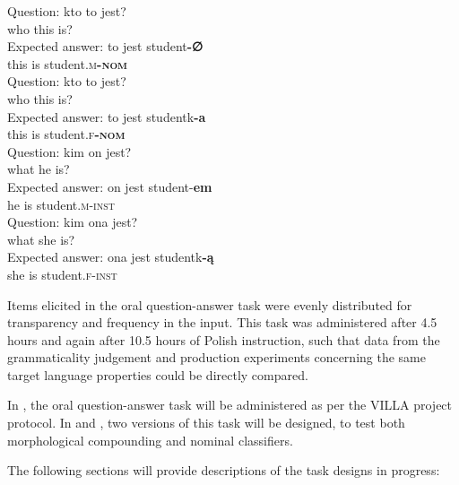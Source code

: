 \documentclass[output=paper,colorlinks,citecolor=brown,modfonts,nonflat]{../langscibook}
\begin{document}
\ea%
    \label{ex:watorek:4}
    \ea%
    \label{ex:watorek:4a}
    \gll    Question: kto to jest?\\
            {} who this is?\\
            
    \gll    Expected answer: to jest student\textbf{-∅}\\
            {} {} this is student\textsc{.m\textbf{-nom}}\\
    \ex%
    \label{ex:watorek:4b}
    \gll    Question: kto to jest?\\
            {} who this is?\\
            
    \gll    Expected answer: to jest studentk\textbf{{-a}}\\
            {} {} this is student\textsc{.f\textbf{-nom}}\\
    \ex%
    \label{ex:watorek:4c}
    \gll    Question: kim on jest?\\
            {} what he is?\\
            
    \gll    Expected answer: on jest student-\textbf{{em}}\\
            {} {} he is student\textsc{.m-inst}\\
    \ex%
    \label{ex:watorek:4d}
    \gll    Question: kim ona jest?\\
            {} what she is?\\

    \gll    Expected answer: ona jest studentk\textbf{{-ą}}\\
            {} {} she is student\textsc{.f-inst}\\
    \z
\z

Items elicited in the oral question-answer task were evenly distributed for transparency and frequency in the input. This task was administered after 4.5 hours and again after 10.5 hours of Polish instruction, such that data from the grammaticality judgement and production experiments concerning the same target language properties could be directly compared. 

In , the oral question-answer task will be administered as per the VILLA project protocol. In  and , two versions of this task will be designed, to test both morphological compounding and nominal classifiers.

The following sections will provide descriptions of the task designs in progress:
\end{document}

